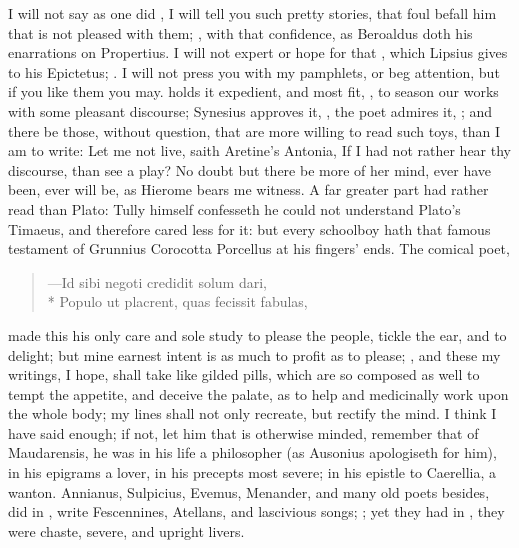 {I will not  say as one did , I will tell you such pretty
stories, that foul befall him that is not pleased with them; , with
that confidence, as Beroaldus doth his enarrations on Propertius. I
will not expert or hope for that , which Lipsius gives to
his Epictetus; . I will not
press you with my pamphlets, or beg attention, but if you
like them you may. \Pliny{} holds it expedient, and most fit, , to season our works with some
pleasant discourse; Synesius approves it, , the
poet admires it, ; and
there be those, without question, that are more willing to read such
toys, than I am to write: Let me not live, saith Aretine's
Antonia, If I had not rather hear thy discourse, than see a play?
No doubt but there be more of her mind, ever have been, ever will be,
as Hierome bears me witness. A far greater part had rather read
\Apuleius than Plato: Tully himself confesseth he could not understand
Plato's Timaeus, and therefore cared less for it: but every schoolboy
hath that famous testament of Grunnius Corocotta Porcellus at his
fingers' ends. The comical poet,

\begin{latin}
\begin{verse}
---Id sibi negoti credidit solum dari,\\*
Populo ut placrent, quas fecissit fabulas,
\end{verse}
\end{latin}

made this his only care and sole study to please the people, tickle the
ear, and to delight; but mine earnest intent is as much to profit as to
please; , and these
my writings, I hope, shall take like gilded pills, which are so
composed as well to tempt the appetite, and deceive the palate, as to
help and medicinally work upon the whole body; my lines shall not only
recreate, but rectify the mind. I think I have said enough; if not, let
him that is otherwise minded, remember that of Maudarensis, he
was in his life a philosopher (as Ausonius apologiseth for him), in his
epigrams a lover, in his precepts most severe; in his epistle to
Caerellia, a wanton. Annianus, Sulpicius, Evemus, Menander, and many
old poets besides, did in , write Fescennines,
Atellans, and lascivious songs; ; yet they had in
, they were chaste, severe, and upright
livers.

}
